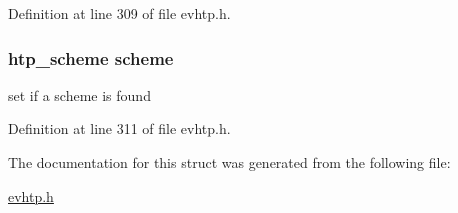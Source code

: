 Definition at line 309 of file evhtp.h.

\hypertarget{structevhtp__uri__s_ad585f48c56bdcc852338aa35466e3f8d}{
\subsubsection[{scheme}]{\setlength{\rightskip}{0pt plus 5cm}htp\_\-scheme {\bf scheme}}}
\label{structevhtp__uri__s_ad585f48c56bdcc852338aa35466e3f8d}
set if a scheme is found 

Definition at line 311 of file evhtp.h.



The documentation for this struct was generated from the following file:\begin{DoxyCompactItemize}
\item 
\hyperlink{evhtp_8h}{evhtp.h}\end{DoxyCompactItemize}
